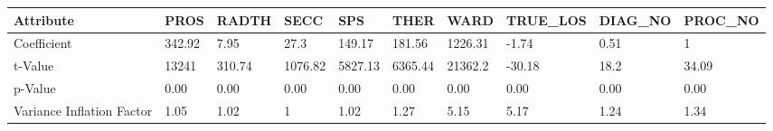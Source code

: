 \begin{tabular}{llllllllll}
\toprule
Attribute &    PROS &   RADTH &     SECC &      SPS &     THER &     WARD & TRUE\_LOS & DIAG\_NO & PROC\_NO \\
\midrule
Coefficient               &  342.92 &    7.95 &     27.3 &   149.17 &   181.56 &  1226.31 &    -1.74 &    0.51 &       1 \\
t-Value                   &   13241 &  310.74 &  1076.82 &  5827.13 &  6365.44 &  21362.2 &   -30.18 &    18.2 &   34.09 \\
p-Value                   &    0.00 &    0.00 &     0.00 &     0.00 &     0.00 &     0.00 &     0.00 &    0.00 &    0.00 \\
Variance Inflation Factor &    1.05 &    1.02 &        1 &     1.02 &     1.27 &     5.15 &     5.17 &    1.24 &    1.34 \\
\bottomrule
\end{tabular}
